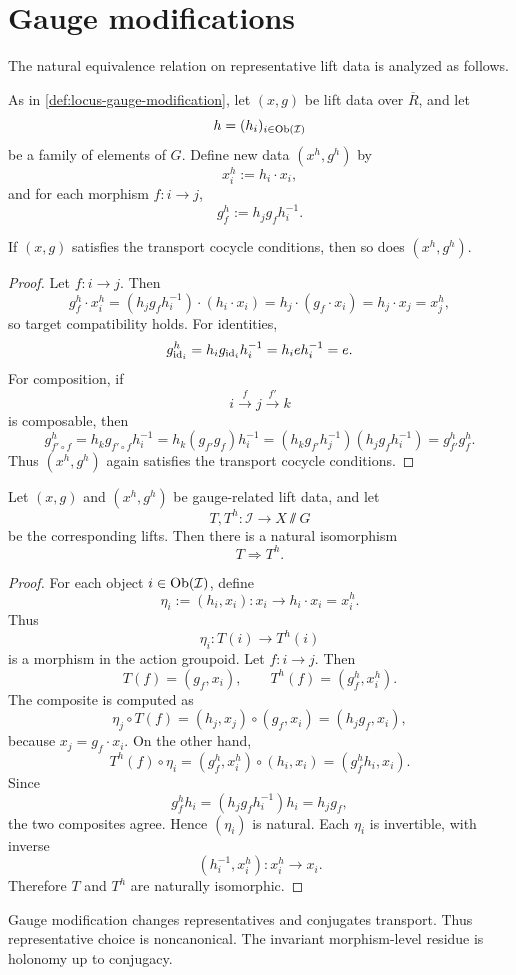 \section{Gauge modifications}
\label{sec:lift-gauge}
The natural equivalence relation on representative lift
data is analyzed as follows.
\begin{definition}
	As in \cref{def:locus-gauge-modification}, let \((x,g)\) be lift data over \(\overline R\), and let
	\[
		h=(h_i)_{i\in\operatorname{Ob}(\mathcal I)}
	\]
	be a family of elements of \(G\).
	Define new data \((x^h,g^h)\) by
	\[
		x_i^h:=h_i\cdot x_i,
	\]
	and for each morphism \(f:i\to j\),
	\[
		g_f^h:=h_j g_f h_i^{-1}.
	\]
\end{definition}
\begin{lemma}
	If \((x,g)\) satisfies the transport cocycle conditions, then so does
	\((x^h,g^h)\).
\end{lemma}
\begin{proof}
	Let \(f:i\to j\).
	Then
	\[
		g_f^h\cdot x_i^h
		=
		(h_j g_f h_i^{-1})\cdot(h_i\cdot x_i)
		=
		h_j\cdot(g_f\cdot x_i)
		=
		h_j\cdot x_j
		=
		x_j^h,
	\]
	so target compatibility holds.
	For identities,
	\[
		g_{\operatorname{id}_i}^h
		=
		h_i g_{\operatorname{id}_i} h_i^{-1}
		=
		h_i e h_i^{-1}
		=
		e.
	\]
	For composition, if
	\[
		i\xrightarrow{f}j\xrightarrow{f'}k
	\]
	is composable, then
	\[
		g_{f'\circ f}^h
		=
		h_k g_{f'\circ f} h_i^{-1}
		=
		h_k(g_{f'}g_f)h_i^{-1}
		=
		(h_k g_{f'} h_j^{-1})(h_j g_f h_i^{-1})
		=
		g_{f'}^h g_f^h.
	\]
	Thus \((x^h,g^h)\) again satisfies the transport cocycle conditions.
\end{proof}
\begin{proposition}
	Let \((x,g)\) and \((x^h,g^h)\) be gauge-related lift data, and let
	\[
		T,T^h:\mathcal I\to X\sslash G
	\]
	be the corresponding lifts.
	Then there is a natural isomorphism
	\[
		T\Longrightarrow T^h.
	\]
\end{proposition}
\begin{proof}
	For each object \(i\in\operatorname{Ob}(\mathcal I)\), define
	\[
		\eta_i:=(h_i,x_i):x_i\to h_i\cdot x_i=x_i^h.
	\]
	Thus
	\[
		\eta_i:T(i)\to T^h(i)
	\]
	is a morphism in the action groupoid.
	Let \(f:i\to j\).
	Then
	\[
		T(f)=(g_f,x_i),
		\qquad
		T^h(f)=(g_f^h,x_i^h).
	\]
	The composite is computed as
	\[
		\eta_j\circ T(f)
		=
		(h_j,x_j)\circ(g_f,x_i)
		=
		(h_j g_f,x_i),
	\]
	because \(x_j=g_f\cdot x_i\).
	On the other hand,
	\[
		T^h(f)\circ\eta_i
		=
		(g_f^h,x_i^h)\circ(h_i,x_i)
		=
		(g_f^h h_i,x_i).
	\]
	Since
	\[
		g_f^h h_i=(h_j g_f h_i^{-1})h_i=h_j g_f,
	\]
	the two composites agree.
	Hence \((\eta_i)\) is natural.
	Each \(\eta_i\) is invertible, with inverse
	\[
		(h_i^{-1},x_i^h):x_i^h\to x_i.
	\]
	Therefore \(T\) and \(T^h\) are naturally isomorphic.
\end{proof}
\begin{remark}
	Gauge modification changes representatives and conjugates transport.
	Thus representative choice is noncanonical.
	The invariant morphism-level residue is holonomy up to conjugacy.
\end{remark}

